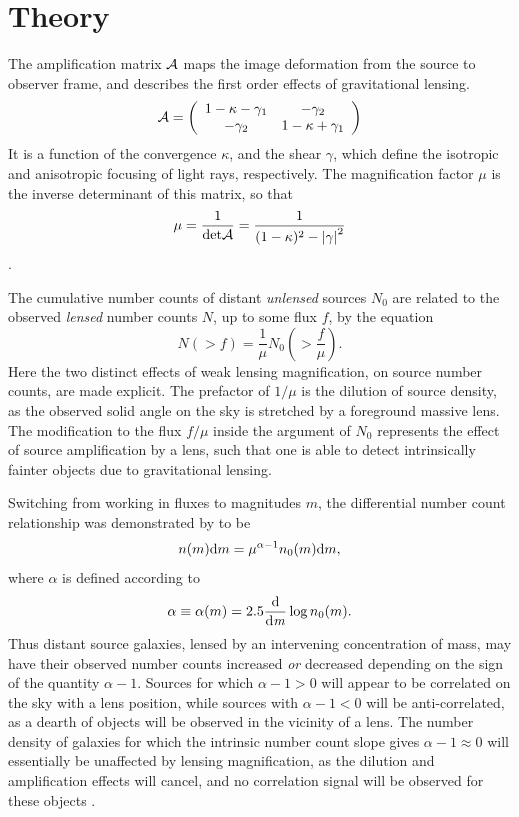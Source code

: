 \section{Theory}
\label{sec:theory2}
The amplification matrix $\cal{A}$ maps the image deformation from the source to observer frame, and describes the first order effects of gravitational lensing.  
\begin{equation}
\cal{A} = \left( \begin{array}{cc}
{1-\kappa-\gamma_1} & {-\gamma_2} \\
{-\gamma_2} & {1-\kappa+\gamma_1} \\
\end{array} \right) 
\end{equation}
It is a function of the convergence $\kappa$, and the shear $\gamma$, which define the isotropic and anisotropic focusing of light rays, respectively.  The magnification factor $\mu$ is the inverse determinant of this matrix, so that
\begin{equation}
\mu = \frac{1}{\mathrm{det} \cal{A}} = 
\frac{1}{(1-\kappa)^2 - \left|\gamma\right|^2}
\end{equation}
\citep{BS01}.  

The cumulative number counts of distant {\it unlensed} sources $N_0$ are related to the observed {\it lensed} number counts $N$, up to some flux $f$, by the equation
\begin{equation}
N (>f) = \frac{1}{\mu} N_0 \left( > \frac{f}{\mu} \right).
\end{equation}
Here the two distinct effects of weak lensing magnification, on source number counts, are made explicit.  The prefactor of $1 / \mu$ is the dilution of source density, as the observed solid angle on the sky is stretched by a foreground massive lens.  The modification to the flux $f / \mu$ inside the argument of $N_0$ represents the effect of source amplification by a lens, such that one is able to detect intrinsically fainter objects due to gravitational lensing.

Switching from working in fluxes to magnitudes $m$, the differential number count relationship was demonstrated by \citet{Narayan89} to be
\begin{equation}
n(m){\rm d}m = \mu ^{\alpha -1} n_0 (m){\rm d}m,
\end{equation}
where $\alpha$ is defined according to
\begin{equation}
\alpha \equiv \alpha(m) = 2.5 \frac{\mathrm d}{\mathrm d \it m} \log n_0(m).
\end{equation}
Thus distant source galaxies, lensed by an intervening concentration of mass, may have their observed number counts increased {\it or} decreased depending on the sign of the quantity $\alpha -1$.  Sources for which $\alpha -1 > 0$ will appear to be correlated on the sky with a lens position, while sources with $\alpha -1 < 0$ will be anti-correlated, as a dearth of objects will be observed in the vicinity of a lens.  The number density of galaxies for which the intrinsic number count slope gives $\alpha -1 \approx 0$ will essentially be unaffected by lensing magnification, as the dilution and amplification effects will cancel, and no correlation signal will be observed for these objects \citep{Scranton05}.

